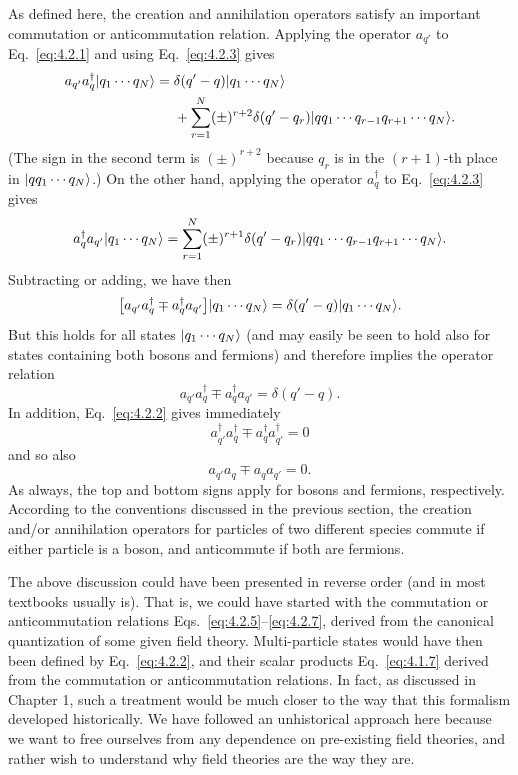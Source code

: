 As defined here, the creation and annihilation operators satisfy an important
commutation or anticommutation relation. Applying the operator
$a_{q'}$ to Eq.~\eqref{eq:4.2.1} and using Eq.~\eqref{eq:4.2.3} gives
\begin{align*}
  a_{q'}a^\dagger_q\lvert q_1\cdots q_N\rangle
  ={}& \delta(q'-q)\lvert q_1\cdots q_N\rangle
  \\
  &+\sum_{r=1}^{N}(\pm)^{r+2}\delta(q'-q_r)
    \lvert q q_1\cdots q_{r-1}q_{r+1}\cdots q_N\rangle.
\end{align*}
(The sign in the second term is $(\pm)^{r+2}$ because $q_r$ is in the $(r+1)$-th place
in $\lvert q q_1\cdots q_N\rangle$.) On the other hand, applying the operator $a^\dagger_q$ to Eq.~\eqref{eq:4.2.3}
gives
\[
  a^\dagger_q a_{q'}\lvert q_1\cdots q_N\rangle
  =\sum_{r=1}^{N}(\pm)^{r+1}\delta(q'-q_r)
  \lvert q q_1\cdots q_{r-1}q_{r+1}\cdots q_N\rangle.
\]
Subtracting or adding, we have then
\[
  \bigl[a_{q'}a^\dagger_q\mp a^\dagger_q a_{q'}\bigr]\lvert q_1\cdots q_N\rangle
  =\delta(q'-q)\lvert q_1\cdots q_N\rangle.
\]
But this holds for all states $\lvert q_1\cdots q_N\rangle$ (and may easily be seen to hold also
for states containing both bosons and fermions) and therefore implies the
operator relation
\begin{equation}
  a_{q'}a^\dagger_q\mp a^\dagger_q a_{q'}=\delta(q'-q).
  \tag{4.2.5}
  \label{eq:4.2.5}
\end{equation}
In addition, Eq.~\eqref{eq:4.2.2} gives immediately
\begin{equation}
  a^\dagger_{q'}a^\dagger_q\mp a^\dagger_q a^\dagger_{q'}=0
  \tag{4.2.6}
  \label{eq:4.2.6}
\end{equation}
and so also
\begin{equation}
  a_{q'}a_q\mp a_q a_{q'}=0.
  \tag{4.2.7}
  \label{eq:4.2.7}
\end{equation}
As always, the top and bottom signs apply for bosons and fermions,
respectively. According to the conventions discussed in the previous
section, the creation and/or annihilation operators for particles of two
different species commute if either particle is a boson, and anticommute
if both are fermions.

The above discussion could have been presented in reverse order (and
in most textbooks usually is). That is, we could have started with the
commutation or anticommutation relations Eqs.~\eqref{eq:4.2.5}--\eqref{eq:4.2.7}, derived
from the canonical quantization of some given field theory. Multi-particle
states would have then been defined by Eq.~\eqref{eq:4.2.2}, and their scalar
products Eq.~\eqref{eq:4.1.7} derived from the commutation or anticommutation
relations. In fact, as discussed in Chapter 1, such a treatment would be
much closer to the way that this formalism developed historically. We
have followed an unhistorical approach here because we want to free
ourselves from any dependence on pre-existing field theories, and rather
wish to understand why field theories are the way they are.

